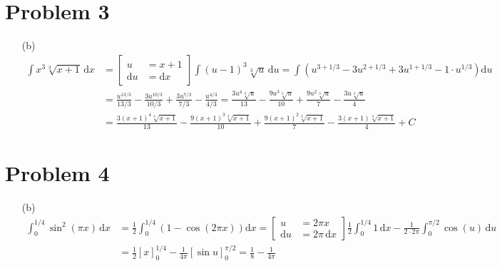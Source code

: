 \documentclass[preview, margin=0.6in]{standalone}
\newcommand*{\problem}[1]{\section*{Problem #1}}
\begin{document}
\problem{3}
\begin{itemize}
	\item[(b)]
	\begin{align*}
	    \int x^3 \sqrt[3]{x+1}\,\mathrm{d}x
		&=\left[ \begin{aligned}
			u&=x+1 \\
			\mathrm{d}u&=\mathrm{d}x
		\end{aligned} \right]
		\int \left(u-1\right)^3 \sqrt[3]{u}\,\mathrm{d}u
		=\int\left(u^{3+1/3}-3u^{2+1/3}+3u^{1+1/3}-1\cdot u^{1/3}\right)\mathrm{d}u \\
		&=\frac{u^{13/3}}{13/3}-\frac{3u^{10/3}}{10/3}+\frac{3u^{7/3}}{7/3}-\frac{u^{4/3}}{4/3}
		=\frac{3u^4 \sqrt[3]{u}}{13}-\frac{9u^3 \sqrt[3]{u}}{10}+\frac{9u^2 \sqrt[3]{u}}{7}-\frac{3u \sqrt[3]{u}}{4} \\
		&=\boxed{\frac{3(x+1)^4 \sqrt[3]{x+1}}{13}-\frac{9(x+1)^3 \sqrt[3]{x+1}}{10}+\frac{9(x+1)^2 \sqrt[3]{x+1}}{7}-\frac{3(x+1) \sqrt[3]{x+1}}{4}+C}
	\end{align*}
\end{itemize}

\problem{4}
\begin{itemize}
	\item[(b)]
	\begin{align*}
	    \int_{0}^{1/4}\sin^2(\pi x)\,\mathrm{d}x
		&=\frac12 \int_{0}^{1/4}\left(1-\cos\left(2\pi x\right)\right)\mathrm{d}x
		=\left[ \begin{aligned}
			u&=2\pi x \\
			\mathrm{d}u&=2\pi \,\mathrm{d}x
		\end{aligned} \right]
		\frac12 \int_{0}^{1/4}1\,\mathrm{d}x-\frac{1}{2\cdot2\pi} \int_{0}^{\pi/2}\cos(u)\,\mathrm{d}u \\
		&=\frac12 \left[x\right]_{0}^{1/4}-\frac{1}{4\pi}\left[\sin u\right]_{0}^{\pi/2}
		=\boxed{\frac{1}{8}-\frac{1}{4\pi}}
	\end{align*}
\end{itemize}
\end{document}
